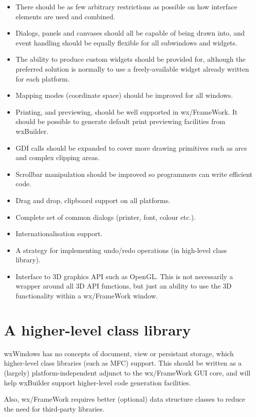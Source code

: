 \begin{itemize}
\item There should be as few arbitrary restrictions as possible on how
interface elements are used and combined.
\item Dialogs, panels and canvases should all be capable of being drawn
into, and event handling should be equally flexible for all subwindows
and widgets.
\item The ability to produce custom widgets should be provided for,
although the preferred solution is normally to use a freely-available
widget already written for each platform.
\item Mapping modes (coordinate space) should be improved for all
windows.
\item Printing, and previewing, should be well supported in
wx/FrameWork. It should be possible to generate default print
previewing facilities from wxBuilder.
\item GDI calls should be expanded to cover more drawing primitives such
as arcs and complex clipping areas.
\item Scrollbar manipulation should be improved so programmers can
write efficient code.
\item Drag and drop, clipboard support on all platforms.
\item Complete set of common dialogs (printer, font, colour etc.).
\item Internationalisation support.
\item A strategy for implementing undo/redo operations (in high-level class library).
\item Interface to 3D graphics API such as OpenGL. This is not necessarily a
wrapper around all 3D API functions, but just an ability to use the 3D
functionality within a wx/FrameWork window.
\end{itemize}

\chapter{A higher-level class library}

wxWindows has no concepts of document, view or persistant storage, which
higher-level class libraries (such as MFC) support. This should be
written as a (largely) platform-independent adjunct to the wx/FrameWork GUI core,
and will help wxBuilder support higher-level code generation facilities.

Also, wx/FrameWork requires better (optional) data structure classes to reduce
the need for third-party libraries.


